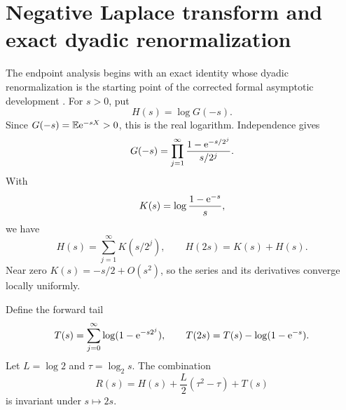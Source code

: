 \documentclass[11pt]{article}
\theoremstyle{definition}
\theoremstyle{remark}
\newcommand{\E}{\mathbb E}\newcommand{\Prob}{\mathbb P}
\begin{document}
\section{Negative Laplace transform and exact dyadic renormalization}\label{sec:negative-laplace}
The endpoint analysis begins with an exact identity whose dyadic renormalization is the starting point of the corrected formal asymptotic development \cite{ReshetnikovLean,ReshetnikovAudit}.  For $s>0$, put
\begin{equation}\label{eq:H-def}
 H(s)=\log G(-s).
\end{equation}
Since $G(-s)=\E\e^{-sX}>0$, this is the real logarithm.  Independence gives
\begin{equation}\label{eq:negative-product}
 G(-s)=\prod_{j=1}^{\infty}\frac{1-\mathrm e^{-s/2^j}}{s/2^j}.
\end{equation}
With
\begin{equation}\label{eq:K-def}
 K(s)=\log\frac{1-\mathrm e^{-s}}{s},
\end{equation}
we have
\begin{equation}\label{eq:H-series}
 H(s)=\sum_{j=1}^{\infty}K(s/2^j),
 \qquad H(2s)=K(s)+H(s).
\end{equation}
Near zero $K(s)=-s/2+O(s^2)$, so the series and its derivatives converge locally uniformly.

Define the forward tail
\begin{equation}\label{eq:T-def}
 T(s)=\sum_{j=0}^{\infty}\log(1-\mathrm e^{-s2^j}),
 \qquad T(2s)=T(s)-\log(1-\mathrm e^{-s}).
\end{equation}
Let $L=\log2$ and $\tau=\log_2s$.  The combination
\begin{equation}\label{eq:R-periodic}
 R(s)=H(s)+\frac L2(\tau^2-\tau)+T(s)
\end{equation}
is invariant under $s\mapsto2s$.
\end{document}
